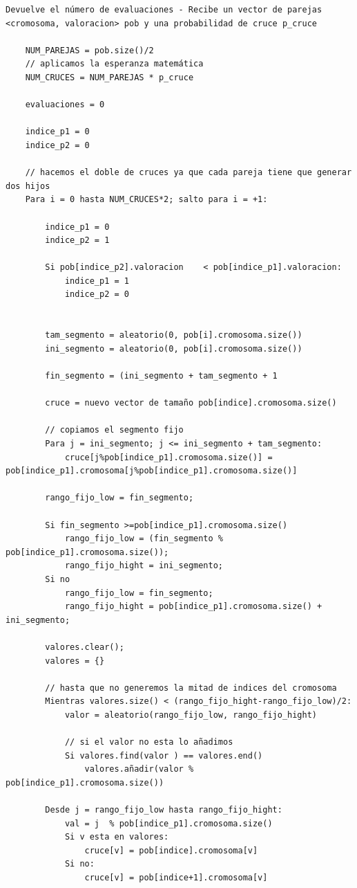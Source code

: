 \documentclass[12pt, spanish]{article}
\begin{document}
\begin{lstlisting}
Devuelve el número de evaluaciones - Recibe un vector de parejas <cromosoma, valoracion> pob y una probabilidad de cruce p_cruce

	NUM_PAREJAS = pob.size()/2
	// aplicamos la esperanza matemática
	NUM_CRUCES = NUM_PAREJAS * p_cruce
	
	evaluaciones = 0
	
	indice_p1 = 0
	indice_p2 = 0
	
	// hacemos el doble de cruces ya que cada pareja tiene que generar dos hijos	
	Para i = 0 hasta NUM_CRUCES*2; salto para i = +1:
	
		indice_p1 = 0
		indice_p2 = 1	
	
		Si pob[indice_p2].valoracion	< pob[indice_p1].valoracion:
			indice_p1 = 1
			indice_p2 = 0
	
	
		tam_segmento = aleatorio(0, pob[i].cromosoma.size())
		ini_segmento = aleatorio(0, pob[i].cromosoma.size())
		
		fin_segmento = (ini_segmento + tam_segmento + 1
	
		cruce = nuevo vector de tamaño pob[indice].cromosoma.size()
	
		// copiamos el segmento fijo
		Para j = ini_segmento; j <= ini_segmento + tam_segmento:
			cruce[j%pob[indice_p1].cromosoma.size()] = pob[indice_p1].cromosoma[j%pob[indice_p1].cromosoma.size()]
	
		rango_fijo_low = fin_segmento;

		Si fin_segmento >=pob[indice_p1].cromosoma.size()
			rango_fijo_low = (fin_segmento % pob[indice_p1].cromosoma.size());
			rango_fijo_hight = ini_segmento;
		Si no
			rango_fijo_low = fin_segmento;
			rango_fijo_hight = pob[indice_p1].cromosoma.size() + ini_segmento;

		valores.clear();
		valores = {}

		// hasta que no generemos la mitad de indices del cromosoma		
		Mientras valores.size() < (rango_fijo_hight-rango_fijo_low)/2:
			valor = aleatorio(rango_fijo_low, rango_fijo_hight)
			
			// si el valor no esta lo añadimos
			Si valores.find(valor ) == valores.end() 
				valores.añadir(valor % pob[indice_p1].cromosoma.size())
		
		Desde j = rango_fijo_low hasta rango_fijo_hight:
			val = j  % pob[indice_p1].cromosoma.size()
			Si v esta en valores:
				cruce[v] = pob[indice].cromosoma[v]
			Si no:
				cruce[v] = pob[indice+1].cromosoma[v]
				

\end{lstlisting}
\end{document}
